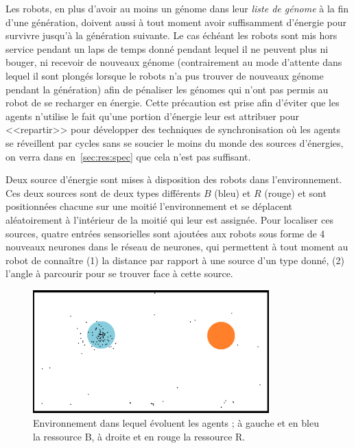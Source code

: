 \documentclass[a4paper,10pt]{report}
\begin{document}
Les robots, en plus d'avoir au moins un génome dans leur \emph{liste de génome} à la fin d'une génération, doivent aussi à tout moment avoir suffisamment d'énergie pour survivre jusqu'à la génération suivante. Le cas échéant les robots sont mis hors service pendant un laps de temps donné pendant lequel il ne peuvent plus ni bouger, ni recevoir de nouveaux génome (contrairement au mode d'attente dans lequel il sont plongés lorsque le robots n'a pus trouver de nouveaux génome pendant la génération) afin de pénaliser les génomes qui n'ont pas permis au robot de se recharger en énergie. Cette précaution est prise afin d'éviter que les agents n'utilise le fait qu'une portion d'énergie leur est attribuer pour <<repartir>> pour développer des techniques de synchronisation où les agents se réveillent par cycles sans se soucier le moins du monde des sources d'énergies, on verra dans en~\ref{sec:res:spec} que cela n'est pas suffisant. 

Deux source d'énergie sont mises à disposition des robots dans l'environnement. Ces deux sources sont de deux types différents $B$ (bleu) et $R$ (rouge) et sont positionnées chacune sur une moitié l'environnement et se déplacent aléatoirement à l'intérieur de la moitié qui leur est assignée. 
Pour localiser ces sources, quatre entrées sensorielles sont ajoutées aux robots sous forme de 4 nouveaux neurones dans le réseau de neurones, qui permettent à tout moment au robot de connaître (1) la distance par rapport à une source d'un type donné, (2) l'angle à parcourir pour se trouver face à cette source.

\begin{figure}[H]
\begin{center}
\includegraphics[height=4.75cm]{images/1roborob_sp_201106}
\caption[Environnement avec ressources multiples]{Environnement dans lequel évoluent les agents ; à gauche et en bleu la ressource B, à droite et en rouge la ressource R.}
\label{fig:envo}
\end{center}
\end{figure}
\end{document}

